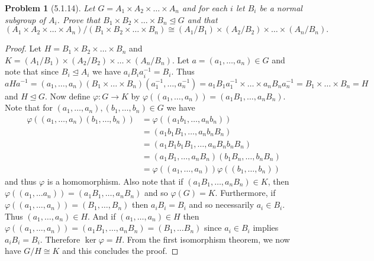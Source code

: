 \documentclass{article}
\newtheorem{problem}{Problem}
\newcommand{\normal}{\unlhd}
\begin{document}
\begin{problem}[5.1.14]
\label{fractions}
Let $G = A_1 \times A_2 \times \dots \times A_n$ and for each $i$ let $B_i$ be a normal subgroup of $A_i$. Prove that $B_1 \times B_2 \times \dots \times B_n \normal G$ and that
\[
(A_1 \times A_2 \times \dots \times A_n)/(B_1 \times B_2 \times \dots \times B_n) \cong (A_1/B_1) \times (A_2/B_2) \times \dots \times (A_n/B_n).
\]
\end{problem}
\begin{proof}
Let $H = B_1 \times B_2 \times \dots \times B_n$ and $K = (A_1/B_1) \times (A_2/B_2) \times \dots \times (A_n/B_n)$. Let $a = (a_1, \dots , a_n) \in G$ and note that since $B_i \normal A_i$ we have $a_iB_ia_i^{-1} = B_i$. Thus
\[
aHa^{-1} = (a_1, \dots , a_n)(B_1 \times \dots \times B_n)(a_1^{-1}, \dots , a_n^{-1}) = a_1B_1a_1^{-1} \times \dots \times a_nB_na_n^{-1} = B_1 \times \dots \times B_n = H
\]
and $H \normal G$. Now define $\varphi : G \to K$ by $\varphi((a_1, \dots , a_n)) = (a_1B_1, \dots , a_nB_n)$. Note that for $(a_1, \dots , a_n), (b_1, \dots , b_n) \in G$ we have
\begin{align*}
\varphi((a_1, \dots , a_n)(b_1, \dots , b_n))
&= \varphi((a_1b_1, \dots , a_nb_n))\\
&= (a_1b_1B_1, \dots , a_nb_nB_n)\\
&= (a_1B_1b_1B_1, \dots , a_nB_nb_nB_n)\\
&= (a_1B_1, \dots , a_nB_n)(b_1B_n, \dots , b_nB_n)\\
&= \varphi((a_1, \dots , a_n))\varphi((b_1, \dots , b_n))
\end{align*}
and thus $\varphi$ is a homomorphism. Also note that if $(a_1B_1, \dots , a_nB_n) \in K$, then $\varphi((a_1, \dots a_n)) = (a_1B_1, \dots , a_nB_n)$ and so $\varphi(G) = K$. Furthermore, if $\varphi((a_1, \dots , a_n)) = (B_1, \dots , B_n)$ then $a_iB_i = B_i$ and so necessarily $a_i \in B_i$. Thus $(a_1, \dots, a_n) \in H$. And if $(a_1, \dots , a_n) \in H$ then $\varphi((a_1, \dots , a_n)) = (a_1B_1, \dots , a_nB_n) = (B_1, \dots B_n)$ since $a_i \in B_i$ implies $a_iB_i = B_i$. Therefore $\ker \varphi = H$. From the first isomorphism theorem, we now have $G/H \cong K$ and this concludes the proof.
\end{proof}
\end{document}
